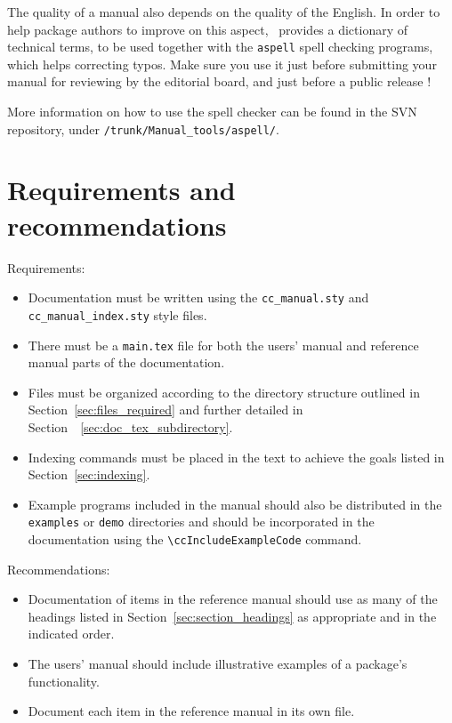 The quality of a manual also depends on the quality of the English.  In order
to help package authors to improve on this aspect, \cgal\ provides a dictionary
of technical terms, to be used together with the \texttt{aspell} spell checking
programs, which helps correcting typos.  Make sure you use it just before
submitting your manual for reviewing by the editorial board, and just before
a public release !

More information on how to use the spell checker can be found in the SVN
repository, under \texttt{/trunk/Manual\_tools/aspell/}.


\section{Requirements and recommendations\label{sec:specification_req_and_rec}}

\noindent
Requirements:
\begin{itemize}
   \item Documentation must be written using the {\tt cc\_manual.sty}
         and {\tt cc\_manual\_index.sty} style files.
   \item There must be a {\tt main.tex} file for both the users' manual
         and reference manual parts of the documentation.
   \item Files must be organized according to the directory structure
         outlined in Section~\ref{sec:files_required} and further detailed
         in Section~~\ref{sec:doc_tex_subdirectory}.
   \item Indexing commands must be placed in the text to achieve the
         goals listed in Section~\ref{sec:indexing}.
   \item Example programs included in the manual should also be distributed
         in the \texttt{examples} or \texttt{demo} directories and should
         be incorporated in the documentation  using the
         \verb|\ccIncludeExampleCode| command.
\end{itemize}

\noindent
Recommendations:
\begin{itemize}
   \item Documentation of items in the reference manual should use as
         many of the headings listed in Section~\ref{sec:section_headings}
         as appropriate and in the indicated order.
   \item The users' manual should include illustrative examples of a package's
         functionality.
   \item Document each item in the reference manual in its own file.
\end{itemize}


